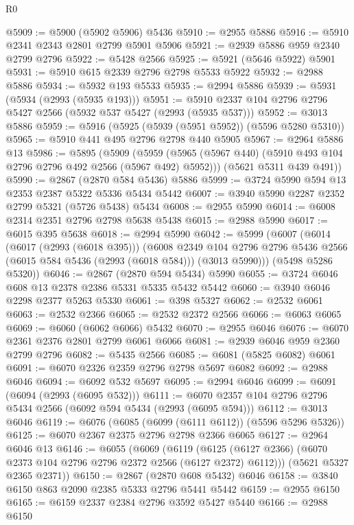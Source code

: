 \begin{lexlean}{R0}
\begin{coremodule}
@5909 := @5900 (@5902 @5906) @5436
@5910 := @2955 @5886
@5916 := @5910 @2341 @2343 @2801 @2799 @5901 @5906
@5921 := @2939 @5886 @959 @2340 @2799 @2796
@5922 := @5428 @2566
@5925 := @5921 (@5646 @5922) @5901
@5931 := @5910 @615 @2339 @2796 @2798 @5533 @5922
@5932 := @2988 @5886
@5934 := @5932 @193 @5533
@5935 := @2994 @5886
@5939 := @5931 (@5934 (@2993 (@5935 @193)))
@5951 := @5910 @2337 @104 @2796 @2796 @5427 @2566 (@5932 @537 @5427 (@2993 (@5935 @537)))
@5952 := @3013 @5886
@5959 := @5916 (@5925 (@5939 (@5951 @5952)) (@5596 @5280 @5310))
@5965 := @5910 @441 @495 @2796 @2798 @440 @5905
@5967 := @2964 @5886 @13
@5986 := @5895
    (@5909
      (@5959 (@5965 (@5967 @440) (@5910 @493 @104 @2796 @2796 @492 @2566 (@5967 @492) @5952)))
      (@5621 @5311 @439 @491))
@5990 := @2867 (@2870 @584 @5436) @5886
@5999 := @3724 @5990 @594 @13 @2353 @2387 @5322 @5336 @5434 @5442
@6007 := @3940 @5990 @2287 @2352 @2799 @5321 (@5726 @5438) @5434
@6008 := @2955 @5990
@6014 := @6008 @2314 @2351 @2796 @2798 @5638 @5438
@6015 := @2988 @5990
@6017 := @6015 @395 @5638
@6018 := @2994 @5990
@6042 := @5999
    (@6007
      (@6014
        (@6017 (@2993 (@6018 @395)))
        (@6008
          @2349
          @104
          @2796
          @2796
          @5436
          @2566
          (@6015 @584 @5436 (@2993 (@6018 @584)))
          (@3013 @5990)))
      (@5498 @5286 @5320))
@6046 := @2867 (@2870 @594 @5434) @5990
@6055 := @3724 @6046 @608 @13 @2378 @2386 @5331 @5335 @5432 @5442
@6060 := @3940 @6046 @2298 @2377 @5263 @5330
@6061 := @398 @5327
@6062 := @2532 @6061
@6063 := @2532 @2366
@6065 := @2532 @2372 @2566
@6066 := @6063 @6065
@6069 := @6060 (@6062 @6066) @5432
@6070 := @2955 @6046
@6076 := @6070 @2361 @2376 @2801 @2799 @6061 @6066
@6081 := @2939 @6046 @959 @2360 @2799 @2796
@6082 := @5435 @2566
@6085 := @6081 (@5825 @6082) @6061
@6091 := @6070 @2326 @2359 @2796 @2798 @5697 @6082
@6092 := @2988 @6046
@6094 := @6092 @532 @5697
@6095 := @2994 @6046
@6099 := @6091 (@6094 (@2993 (@6095 @532)))
@6111 := @6070 @2357 @104 @2796 @2796 @5434 @2566 (@6092 @594 @5434 (@2993 (@6095 @594)))
@6112 := @3013 @6046
@6119 := @6076 (@6085 (@6099 (@6111 @6112)) (@5596 @5296 @5326))
@6125 := @6070 @2367 @2375 @2796 @2798 @2366 @6065
@6127 := @2964 @6046 @13
@6146 := @6055
    (@6069
      (@6119 (@6125 (@6127 @2366) (@6070 @2373 @104 @2796 @2796 @2372 @2566 (@6127 @2372) @6112)))
      (@5621 @5327 @2365 @2371))
@6150 := @2867 (@2870 @608 @5432) @6046
@6158 := @3840 @6150 @863 @2090 @2385 @5333 @2796 @5441 @5442
@6159 := @2955 @6150
@6165 := @6159 @2337 @2384 @2796 @3592 @5427 @5440
@6166 := @2988 @6150

\end{coremodule}
\end{lexlean}
